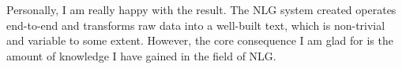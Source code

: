 Personally, I am really happy with the result. The NLG system created operates end-to-end and transforms raw data into a well-built text, which is non-trivial and variable to some extent. However, the core consequence I am glad for is the amount of knowledge I have gained in the field of NLG. 
































